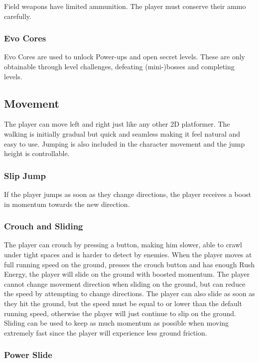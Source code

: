 \documentclass[12pt]{article}
\begin{document}
Field weapons have limited ammunition. The player must conserve their ammo carefully.

\subsubsection{Evo Cores}

Evo Cores are used to unlock Power-ups and open secret levels. These are only obtainable through level challenges, defeating (mini-)bosses and completing levels. 

\subsection{Movement}

The player can move left and right just like any other 2D platformer. The walking is initially gradual but quick and seamless making it feel natural and easy to use. Jumping is also included in the character movement and the jump height is controllable.

\subsubsection{Slip Jump}

If the player jumps as soon as they change directions, the player receives a boost in momentum towards the new direction.

\subsubsection{Crouch and Sliding}

The player can crouch by pressing a button, making him slower, able to crawl under tight spaces and is harder to detect by enemies. When the player moves at full running speed on the ground, presses the crouch button and has enough Rush Energy, the player will slide on the ground with boosted momentum. The player cannot change movement direction when sliding on the ground, but can reduce the speed by attempting to change directions. The player can also slide as soon as they hit the ground, but the speed must be equal to or lower than the default running speed, otherwise the player will just continue to slip on the ground. Sliding can be used to keep as much momentum as possible when moving extremely fast since the player will experience less ground friction. 

\subsubsection{Power Slide}
\end{document}
